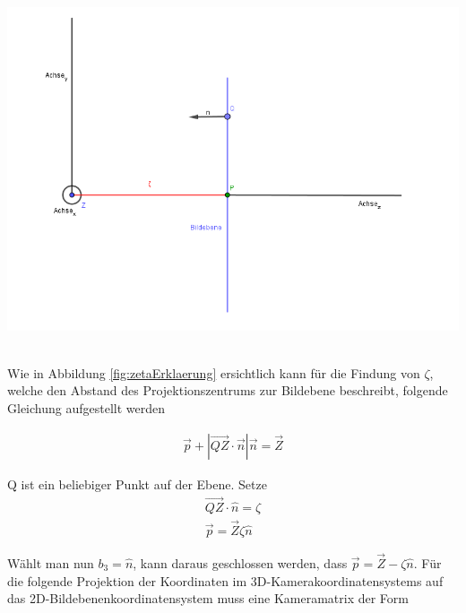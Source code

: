 	\begin{minipage}{\linewidth}
	\centering
	\includegraphics[width=1.\linewidth]{images/ZetaHerleitung.png}
	\label{fig:zetaErklaerung}
\end{minipage}\\

Wie in Abbildung \ref{fig:zetaErklaerung} ersichtlich kann für die Findung von $\zeta$, welche den Abstand des Projektionszentrums zur Bildebene beschreibt, folgende Gleichung aufgestellt werden
		
		\begin{gather}
		\vec{p}+|\vec{QZ} \cdot \vec{n}|\vec{n} = \vec{Z}
		\end{gather}
		
		Q ist ein beliebiger Punkt auf der Ebene. Setze
		\begin{gather}
		\vec{QZ} \cdot \hat{n} = \zeta\\
		\vec{p}= \vec{Z}\zeta \hat{n}
		\end{gather}
		
		Wählt man nun  $b_3 = \hat{n}$, kann daraus geschlossen werden, dass $\vec{p} = \vec{Z} - \zeta \hat{n}$. Für die folgende Projektion der Koordinaten im 3D-Kamerakoordinatensystems auf das 2D-Bildebenenkoordinatensystem muss eine Kameramatrix der Form		
		
